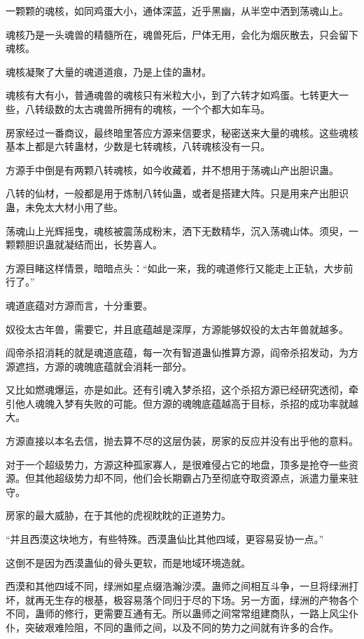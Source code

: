 
\begin{this_body}

一颗颗的魂核，如同鸡蛋大小，通体深蓝，近乎黑幽，从半空中洒到荡魂山上。

魂核乃是一头魂兽的精髓所在，魂兽死后，尸体无用，会化为烟灰散去，只会留下魂核。

魂核凝聚了大量的魂道道痕，乃是上佳的蛊材。

魂核有大有小，普通魂兽的魂核只有米粒大小，到了六转才如鸡蛋。七转更大一些，八转级数的太古魂兽所拥有的魂核，一个个都大如车马。

房家经过一番商议，最终暗里答应方源来信要求，秘密送来大量的魂核。这些魂核基本上都是六转蛊材，少数是七转魂核，八转魂核没有一只。

方源手中倒是有两颗八转魂核，如今收藏着，并不想用于荡魂山产出胆识蛊。

八转的仙材，一般都是用于炼制八转仙蛊，或者是搭建大阵。只是用来产出胆识蛊，未免太大材小用了些。

荡魂山上光辉摇曳，魂核被震荡成粉末，洒下无数精华，沉入荡魂山体。须臾，一颗颗胆识蛊就凝结而出，长势喜人。

方源目睹这样情景，暗暗点头：“如此一来，我的魂道修行又能走上正轨，大步前行了。”

魂道底蕴对方源而言，十分重要。

奴役太古年兽，需要它，并且底蕴越是深厚，方源能够奴役的太古年兽就越多。

阎帝杀招消耗的就是魂道底蕴，每一次有智道蛊仙推算方源，阎帝杀招发动，为方源遮挡，方源的魂魄底蕴就会消耗一部分。

又比如燃魂爆运，亦是如此。还有引魂入梦杀招，这个杀招方源已经研究透彻，牵引他人魂魄入梦有失败的可能。但方源的魂魄底蕴越高于目标，杀招的成功率就越大。

方源直接以本名去信，抛去算不尽的这层伪装，房家的反应并没有出乎他的意料。

对于一个超级势力，方源这种孤家寡人，是很难侵占它的地盘，顶多是抢夺一些资源。但其他超级势力却不同，他们会长期霸占乃至彻底夺取资源点，派遣力量来驻守。

房家的最大威胁，在于其他的虎视眈眈的正道势力。

“并且西漠这块地方，有些特殊。西漠蛊仙比其他四域，更容易妥协一点。”

这倒不是因为西漠蛊仙的骨头更软，而是地域环境造就。

西漠和其他四域不同，绿洲如星点缀浩瀚沙漠。蛊师之间相互斗争，一旦将绿洲打坏，就再无生存的根基，极容易落个同归于尽的下场。另一方面，绿洲的产物各个不同，蛊师的修行，更需要互通有无。所以蛊师之间常常组建商队，一路上风尘仆仆，突破艰难险阻，不同的蛊师之间，以及不同的势力之间就有许多的合作。


\end{this_body}
